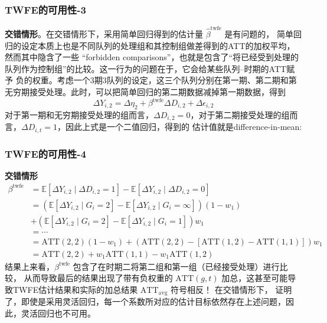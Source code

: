 \documentclass[../didNotes.tex]{subfiles}
\begin{document}
\begin{frame}
  \frametitle{TWFE的可用性-3}

  \textbf{交错情形}。在交错情形下，采用简单回归得到的估计量 $\hat{\beta}^{\text{twfe}}$ 是有问题的，
  简单回归的设定本质上也是不同队列的处理组和其控制组做差得到的ATT的加权平均，然而其中隐含了一些
  ``forbidden comparisons''，也就是包含了``将已经受到处理的队列作为控制组''的比较。这一行为的问题在于，它会给某些队列--时期的ATT赋予
  负的权重。考虑一个3期3队列的设定，这三个队列分别在第一期、第二期和第无穷期接受处理。此时，可以把简单回归的第二期数据减掉第一期数据，得到
  $$
  \Delta Y_{i,2} = \Delta \eta_{2} + \beta^{\text{twfe}} \Delta D_{i,2} + \Delta \epsilon_{i,2}
  $$
  对于第一期和无穷期接受处理的组而言，$\Delta D_{i,2}=0$，对于第二期接受处理的组而言，$\Delta D_{i,t}=1$，因此上式是一个二值回归，得到的
  估计值就是difference-in-mean:

\end{frame}

\begin{frame}
  \frametitle{TWFE的可用性-4}

  \textbf{交错情形}
  \begin{align*}
    \beta^{\text{twfe}} &= \mathbb{E}[\Delta Y_{i,2} \mid \Delta D_{i,2}=1] - \mathbb{E}[\Delta Y_{i,2} \mid
    \Delta D_{i,2}=0] \\
    &= \left(\mathbb{E}[\Delta Y_{i,2} \mid G_{i}=2] - \mathbb{E}[\Delta Y_{i,2} \mid G_{i}=\infty]\right)(1-w_{1}) \\
    &+\left(\mathbb{E}[\Delta Y_{i,2} \mid G_{i}=2] - \mathbb{E}[\Delta Y_{i,2} \mid G_{i}=1]\right)w_{1} \\
    &= \cdots \\
    &= \text{ATT}(2,2)(1-w_{1}) + \left( \text{ATT}(2,2)-[\text{ATT}(1,2)-\text{ATT}(1,1)] \right) w_{1} \\
    &= \text{ATT}(2,2)+w_{1} \text{ATT}(1,1) - w_{1} \text{ATT}(1,2)
  \end{align*}
  结果上来看，$\beta^{\text{twfe}}$ 包含了在时期二将第二组和第一组（已经接受处理）进行比较，
  从而导致最后的结果出现了带有负权重的 $\text{ATT}(g,t)$ 加总，这甚至可能导致TWFE估计结果和实际的加总结果 $\text{ATT}_{\text{avg}}$
  符号相反！
  在交错情形下，\textcite{sun2021} 证明了，即使是采用灵活回归，每一个系数所对应的估计目标依然存在上述问题，因此，灵活回归也不可用。

\end{frame}
\end{document}
